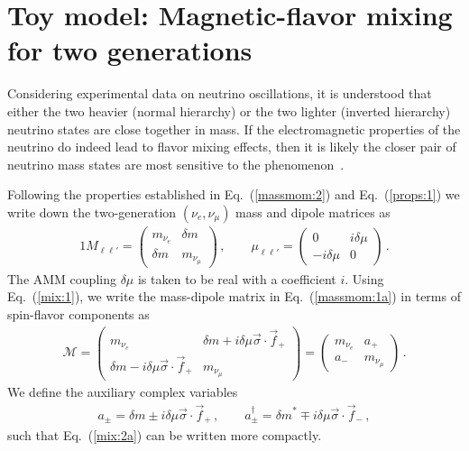 \documentclass[addchapnum]{ws-rv961x669} %
\newcommand{\req}[1]{Eq.~(\ref{#1})}
\begin{document}
\section{Toy model: Magnetic-flavor mixing for two generations}
\label{sec:mix}
Considering experimental data on neutrino oscillations, it is understood that either the two heavier (normal hierarchy) or the two lighter (inverted hierarchy) neutrino states are close together in mass. If the electromagnetic properties of the neutrino do indeed lead to flavor mixing effects, then it is likely the closer pair of neutrino mass states are most sensitive to the phenomenon~\cite{Bethe:1986ej}. 

Following the properties established in \req{massmom:2} and \req{props:1} we write down the two-generation $(\nu_{e},\nu_{\mu})$ mass and dipole matrices as
\begin{alignat}{1}
	\label{mix:1} M_{\ell\ell'}= 
	\begin{pmatrix}
		m_{\nu_{e}} & {\delta m}\\
		{\delta m} & m_{\nu_{\mu}}
	\end{pmatrix}\,,\qquad
	\mu_{\ell\ell'} = 
	\begin{pmatrix}
		0 & i\delta\mu\\
		-i\delta\mu & 0
	\end{pmatrix}\,.
\end{alignat}
The AMM coupling $\delta\mu$ is taken to be real with a coefficient $i$. Using \req{mix:1}, we write the mass-dipole matrix in \req{massmom:1a} in terms of spin-flavor components as
\begin{gather}
	\label{mix:2a}
    \mathcal{M} = 
	\begin{pmatrix}
		m_{\nu_{e}} & {\delta m}+i\delta\mu\vec{\sigma}\cdot\vec{f}_{+}\\
		{\delta m}-i\delta\mu\vec{\sigma}\cdot\vec{f}_{+} & m_{\nu_{\mu}}
	\end{pmatrix}=
    \begin{pmatrix}
        m_{\nu_{e}} & a_{+}\\
        a_{-} & m_{\nu_{\mu}}
    \end{pmatrix}\,.
\end{gather}
We define the auxiliary complex variables
\begin{gather}
    \label{mix:2b}
    a_{\pm}={\delta m}\pm i\delta\mu\vec{\sigma}\cdot\vec{f}_{+}\,,\qquad
    a_{\pm}^{\dag}={\delta m}^{*}\mp i\delta\mu\vec{\sigma}\cdot\vec{f}_{-}\,,
\end{gather}
such that \req{mix:2a} can be written more compactly.
\end{document}
